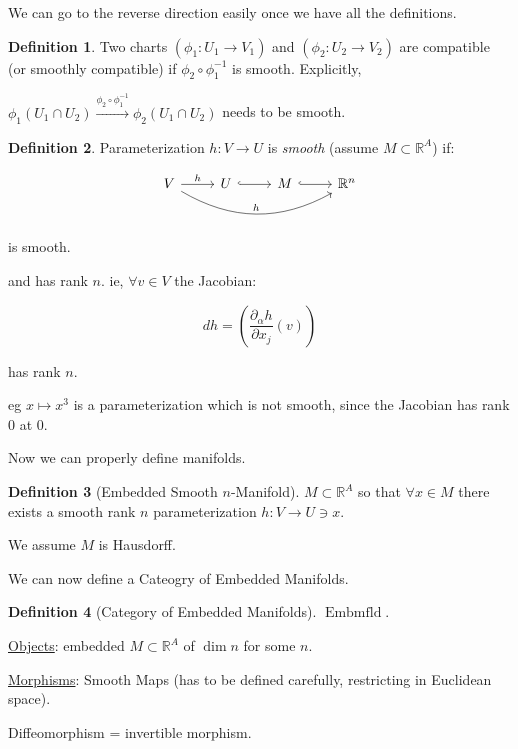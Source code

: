 \documentclass{article}
\theoremstyle{definition}
\newtheorem*{definition}{Definition}
\begin{document}
    We can go to the reverse direction easily once we have all the definitions.

    \begin{definition}
        Two charts \((\phi_1: U_1 \to V_1)\) and \((\phi_2: U_2 \to V_2)\) are compatible (or smoothly compatible) if \(\phi_2 \circ \phi_1 ^{-1}\) is smooth. Explicitly,

        \(\phi_1(U_1 \cap U_2) \xrightarrow{\phi_2 \circ \phi_1 ^{-1}} \phi_2(U_1 \cap U_2)\) needs to be smooth. 
    \end{definition}

    \begin{definition}
        Parameterization \(h: V \to U\) is \textit{smooth} (assume \(M \subset \mathbb{R}^A\)) if:

        \[
            \begin{tikzcd}
                V \ar[r,"h"] \ar[rrr, bend right,"h"] & U \ar[r,hook] & M \ar[r,hook] & \mathbb{R}^n
            \end{tikzcd}
        \]

        is smooth.

        and has rank \(n\). ie, \(\forall v\in V\) the Jacobian:

        \[
            dh = \left( \frac{\partial_\alpha h}{\partial x_j}(v) \right)
        \]
    
        has rank \(n\).

        eg \(x \mapsto x^3\) is a parameterization which is not smooth, since the Jacobian has rank \(0\) at \(0\).
    \end{definition}

    Now we can properly define manifolds.

    \begin{definition}
        [Embedded Smooth \(n\)-Manifold] \(M \subset \mathbb{R}^A\) so that \(\forall x\in M\) there exists a smooth rank \(n\) parameterization \(h : V \to U \ni x\).

        We assume \(M\) is Hausdorff.
    \end{definition}

    We can now define a Cateogry of Embedded Manifolds.

    \begin{definition}
        [Category of Embedded Manifolds] \(\operatorname{Embmfld}\).

        \underline{Objects}: embedded \(M \subset \mathbb{R}^A\) of \(\dim n\) for some \(n\).

        \underline{Morphisms}: Smooth Maps (has to be defined carefully, restricting in Euclidean space).

        Diffeomorphism = invertible morphism.
    \end{definition}
\end{document}
